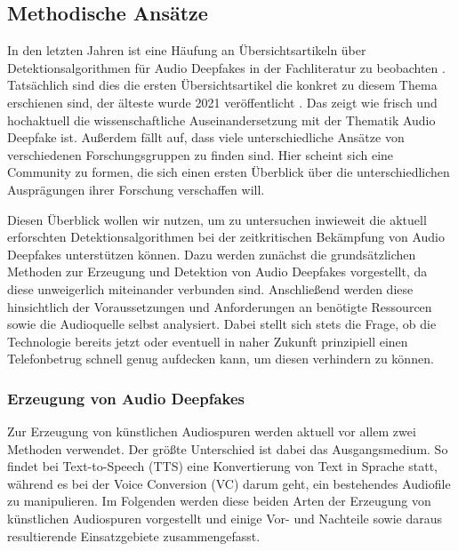 \subsection{Methodische Ansätze}
In den letzten Jahren ist eine Häufung an Übersichtsartikeln über Detektionsalgorithmen für Audio Deepfakes in der Fachliteratur zu beobachten \citep[][]{Masood2022,Almutairi2022,Khanjani2021}.
Tatsächlich sind dies die ersten Übersichtsartikel die konkret zu diesem Thema erschienen sind, der älteste wurde 2021 veröffentlicht \citep[][]{Khanjani2021}.
Das zeigt wie frisch und hochaktuell die wissenschaftliche Auseinandersetzung mit der Thematik Audio Deepfake ist.
Außerdem fällt auf, dass viele unterschiedliche Ansätze von verschiedenen Forschungsgruppen zu finden sind.
Hier scheint sich eine Community zu formen, die sich einen ersten Überblick über die unterschiedlichen Ausprägungen ihrer Forschung verschaffen will.

Diesen Überblick wollen wir nutzen, um zu untersuchen inwieweit die aktuell erforschten Detektionsalgorithmen bei der zeitkritischen Bekämpfung von Audio Deepfakes unterstützen können.
Dazu werden zunächst die grundsätzlichen Methoden zur Erzeugung und Detektion von Audio Deepfakes vorgestellt, da diese unweigerlich miteinander verbunden sind.
Anschließend werden diese hinsichtlich der Voraussetzungen und Anforderungen an benötigte Ressourcen sowie die Audioquelle selbst analysiert.
Dabei stellt sich stets die Frage, ob die Technologie bereits jetzt oder eventuell in naher Zukunft prinzipiell einen Telefonbetrug schnell genug aufdecken kann, um diesen verhindern zu können.

\subsubsection{Erzeugung von Audio Deepfakes}
Zur Erzeugung von künstlichen Audiospuren werden aktuell vor allem zwei Methoden verwendet.
Der größte Unterschied ist dabei das Ausgangsmedium.
So findet bei Text-to-Speech (TTS) eine Konvertierung von Text in Sprache statt, während es bei der Voice Conversion (VC) darum geht, ein bestehendes Audiofile zu manipulieren.
Im Folgenden werden diese beiden Arten der Erzeugung von künstlichen Audiospuren vorgestellt und einige Vor- und Nachteile sowie daraus resultierende Einsatzgebiete zusammengefasst.
\clearpage

